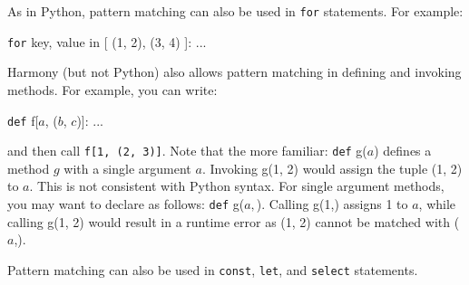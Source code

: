 \documentclass{report}
\newenvironment{code}{
\tcolorbox
}{
\endtcolorbox
}
\begin{document}
As in Python, pattern matching can also be used in \texttt{for} statements.
For example:
\begin{code}
\texttt{for} key, value in [ (1, 2), (3, 4) ]:
    ...
\end{code}

Harmony (but not Python)
also allows pattern matching in defining and invoking methods.
For example, you can write:
\begin{code}
\texttt{def} f[$a$, ($b$, $c$)]: ...
\end{code}
and then call \texttt{f[1, (2, 3)]}.
Note that the more familiar: \texttt{def} g($a$) defines a method $g$ with
a single argument $a$.  Invoking g(1, 2) would assign the tuple (1, 2) to
$a$.  This is not consistent with Python syntax.  For single argument methods,
you may want to declare as follows: \texttt{def} g($a,$).
Calling g(1,) assigns 1 to $a$, while calling g(1, 2) would result in a
runtime error as (1, 2) cannot be matched with ($a$,).

Pattern matching can also be used in \texttt{const}, \texttt{let},
and \texttt{select} statements.
\end{document}

